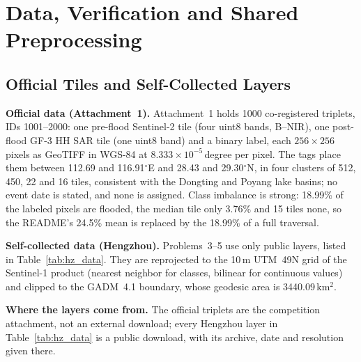 \section[Data and Preprocessing]{Data, Verification and Shared Preprocessing}
\label{sec:data_def}

\subsection{Official Tiles and Self-Collected Layers}

\textbf{Official data (Attachment~1).} Attachment~1 holds 1000 co-registered triplets, IDs 1001--2000: one pre-flood Sentinel-2 tile (four uint8 bands, B--NIR), one post-flood GF-3 HH SAR tile (one uint8 band) and a binary label, each $256\times256$ pixels as GeoTIFF in WGS-84 at $8.333\times10^{-5}$\,degree per pixel. The tags place them between 112.69 and 116.91$^\circ$E and 28.43 and 29.30$^\circ$N, in four clusters of 512, 450, 22 and 16 tiles, consistent with the Dongting and Poyang lake basins; no event date is stated, and none is assigned. Class imbalance is strong: 18.99\% of the labeled pixels are flooded, the median tile only 3.76\% and 15 tiles none, so the README's 24.5\% mean is replaced by the 18.99\% of a full traversal.

\textbf{Self-collected data (Hengzhou).} Problems~3--5 use only public layers, listed in Table~\ref{tab:hz_data}. They are reprojected to the 10\,m UTM~49N grid of the Sentinel-1 product (nearest neighbor for classes, bilinear for continuous values) and clipped to the GADM~4.1 boundary, whose geodesic area is 3440.09\,km$^2$.

\textbf{Where the layers come from.} The official triplets are the competition attachment, not an external download; every Hengzhou layer in Table~\ref{tab:hz_data} is a public download, with its archive, date and resolution given there.

